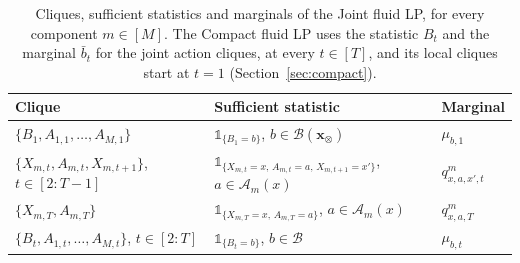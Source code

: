 \documentclass{article}
\begin{document}
\begin{table}[h]
\centering
\small
\renewcommand{\arraystretch}{1.3}
\begin{tabular}{|l|l|l|}
\hline
Clique & Sufficient statistic & Marginal \\
\hline
$\{B_1, A_{1,1}, \ldots, A_{M,1}\}$ & $\mathds{1}_{\{B_1 = b\}}$, $b \in \mathcal{B}(\mathbf{x}_\otimes)$ & $\mu_{b,1}$ \\
$\{X_{m,t}, A_{m,t}, X_{m,t+1}\}$, $t \in [2:T-1]$ & $\mathds{1}_{\{X_{m,t} = x,\, A_{m,t} = a,\, X_{m,t+1} = x'\}}$,
$a \in \mathcal{A}_m(x)$ & $q^m_{x,a,x',t}$ \\
$\{X_{m,T}, A_{m,T}\}$ & $\mathds{1}_{\{X_{m,T} = x,\, A_{m,T} = a\}}$, $a \in \mathcal{A}_m(x)$ & $q^m_{x,a,T}$ \\
$\{B_t, A_{1,t}, \ldots, A_{M,t}\}$, $t \in [2:T]$ & $\mathds{1}_{\{B_t = b\}}$, $b \in \mathcal{B}$ & $\mu_{b,t}$ \\
\hline
\end{tabular}
\caption{Cliques, sufficient statistics and marginals of the Joint fluid LP, for every component $m \in [M]$. The
Compact fluid LP uses the statistic $B_t$ and the marginal $\bar b_t$ for the joint action cliques, at every $t \in
[T]$, and its local cliques start at $t = 1$ (Section~\ref{sec:compact}).}
\label{tab:subsets-joint}
\label{tab:subsets-compact}
\end{table}
\end{document}
